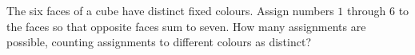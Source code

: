 The six faces of a cube have distinct fixed colours. Assign numbers $1$ through $6$ to the faces so that opposite faces sum to seven. How many assignments are possible, counting assignments to different colours as distinct?
